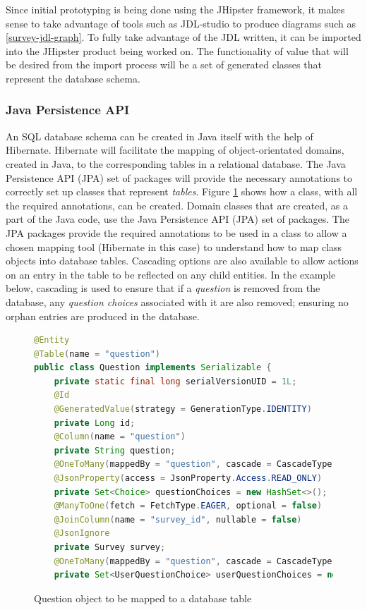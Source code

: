 Since initial prototyping is being done using the JHipster framework, it makes sense to take advantage of tools such as 
JDL-studio to produce diagrams such as \ref{survey-jdl-graph}.
To fully take advantage of the JDL written, it can be imported into the JHipster product being worked on. 
The functionality of value that will be desired from the import process will be a set of generated classes that represent
the database schema.

\subsubsection{Java Persistence API}
An SQL database schema can be created in Java itself with the help of Hibernate. %
Hibernate will facilitate the mapping of object-orientated domains, created in Java, to the corresponding tables in a relational database.
The Java Persistence API (JPA) set of packages will provide the necessary annotations to correctly set up classes that represent \textit{tables}.
Figure \ref{question object} shows how a class, with all the required annotations, can be created.
Domain classes that are created, as a part of the Java code, use the Java Persistence API (JPA) set of packages.
The JPA packages provide the required annotations to be used in a class to allow a chosen mapping tool (Hibernate in this case) to understand how
to map class objects into database tables.
Cascading options are also available to allow actions on an entry in the table to be reflected on any child entities.
In the example below, cascading is used to ensure that if a \textit{question} is removed from the database, any \textit{question choices} associated
with it are also removed; ensuring no orphan entries are produced in the database.

\clearpage
\begin{figure}[ht]
    \centering
    \begin{lstlisting}[language=Java]
@Entity
@Table(name = "question")
public class Question implements Serializable {
    private static final long serialVersionUID = 1L;
    @Id
    @GeneratedValue(strategy = GenerationType.IDENTITY)
    private Long id;
    @Column(name = "question")
    private String question;
    @OneToMany(mappedBy = "question", cascade = CascadeType.ALL)
    @JsonProperty(access = JsonProperty.Access.READ_ONLY)
    private Set<Choice> questionChoices = new HashSet<>();
    @ManyToOne(fetch = FetchType.EAGER, optional = false)
    @JoinColumn(name = "survey_id", nullable = false)
    @JsonIgnore
    private Survey survey;
    @OneToMany(mappedBy = "question", cascade = CascadeType.ALL)
    private Set<UserQuestionChoice> userQuestionChoices = new HashSet<>();
    \end{lstlisting}
    \caption{Question object to be mapped to a database table}
    \label{question object}
\end{figure}


